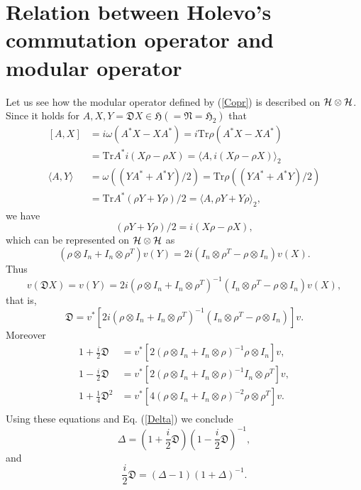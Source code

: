 \section{Relation between Holevo's commutation operator and modular operator}

Let us see how the modular operator defined by  (\ref{Copr}) is described on $\cal{H}\otimes \cal{H}$.
Since it holds for $A,X,Y=\mathfrak{D}X\in \mathfrak{H}(=\mathfrak{N}=\mathfrak{H}_2)$
that 
 \begin{equation}
 \begin{split}
 [A,X]&=i\omega(A^\ast X-XA^\ast)=i\mbox{Tr}\rho(A^\ast X-XA^\ast)\\
      &=\mbox{Tr}A^\ast i(X\rho-\rho X)=\langle A, i(X\rho-\rho X)\rangle_2\\
 \langle A,Y\rangle&=\omega((YA^\ast+A^\ast Y)/2)=\mbox{Tr}\rho((YA^\ast+A^\ast Y)/2)\\
 &=\mbox{Tr}A^\ast(\rho Y+Y\rho)/2=\langle A, \rho Y+Y\rho \rangle_2,
 \end{split}
 \end{equation}
  we have
 $$
 (\rho Y+Y\rho)/2=i(X\rho-\rho X),
 $$
 which can be represented on $\cal{H}\otimes \cal{H}$ as
	$$
	(\rho\otimes I_n+I_n\otimes \rho^T )v(Y)=2i(I_n\otimes \rho^T-\rho\otimes I_n)v(X).
	$$
	Thus 
	$$
	v(\mathfrak{D}X)=v(Y)=2i(\rho\otimes I_n+I_n\otimes \rho^T )^{-1}(I_n\otimes \rho^T -\rho\otimes I_n )v(X),
	$$
	that is,
	$$
	\mathfrak{D}=v^\ast[ 2i( \rho\otimes I_n+I_n\otimes \rho^T )^{-1}(I_n\otimes \rho^T -\rho\otimes I_n )]v.
	$$
	  Moreover
	\begin{equation}  
		\begin{split}
    1+\frac{i}{2}\mathfrak{D}&=v^\ast [ 2(\rho\otimes I_n+I_n\otimes \rho)^{-1}  \rho \otimes I_n]v,\\
    1-\frac{i}{2}\mathfrak{D}&=v^\ast [ 2(\rho\otimes I_n+I_n\otimes \rho)^{-1}I_n \otimes \rho^T]v,\\
    1+\frac{1}{4}\mathfrak{D}^2&=v^\ast[ 4(\rho\otimes I_n+I_n\otimes \rho)^{-2}\rho \otimes \rho^T]v.\\
    \end{split}
	\end{equation}
Using these equations and Eq. (\ref{Delta})  we conclude
		$$
    \Delta=\left(1+\frac{i}{2}\mathfrak{D}\right)\left(1-\frac{i}{2}\mathfrak{D}\right)^{-1},
		$$
		and
		$$
     \frac{i}{2}\mathfrak{D}=(\Delta-1)(1+\Delta)^{-1}.
		$$

